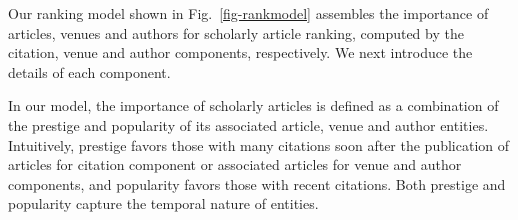 Our ranking model \ensemblerank  shown in Fig.~\ref{fig-rankmodel} assembles the importance of articles, venues and authors for scholarly article ranking, computed by the citation, venue and author components, respectively.
%
We next introduce the details of each component.


In our model, the importance of scholarly articles is defined as a combination of the prestige and popularity of its associated article, venue and author entities. Intuitively, prestige favors those with many citations soon after the publication of articles for citation component or associated articles for venue and author components, and popularity favors those with recent citations. Both prestige and popularity capture the temporal nature of entities.




